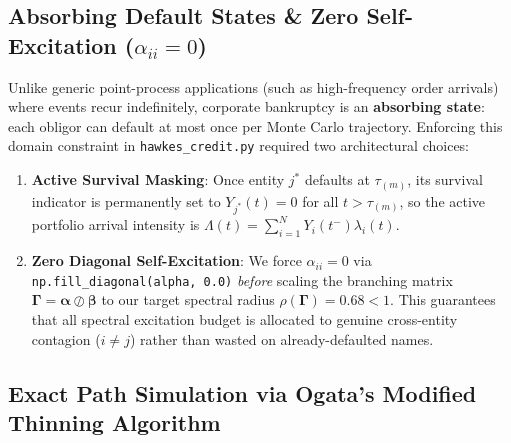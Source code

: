 \documentclass[11pt,a4paper]{article}
\begin{document}
\subsection{Absorbing Default States \& Zero Self-Excitation ($\alpha_{ii} = 0$)}

Unlike generic point-process applications (such as high-frequency order arrivals) where events recur indefinitely, corporate bankruptcy is an \textbf{absorbing state}: each obligor can default at most once per Monte Carlo trajectory. Enforcing this domain constraint in \texttt{hawkes\_credit.py} required two architectural choices:
\begin{enumerate}
  \item \textbf{Active Survival Masking}: Once entity $j^*$ defaults at $\tau_{(m)}$, its survival indicator is permanently set to $Y_{j^*}(t) = 0$ for all $t > \tau_{(m)}$, so the active portfolio arrival intensity is $\Lambda(t) = \sum_{i=1}^{N} Y_i(t^-) \lambda_i(t)$.
  \item \textbf{Zero Diagonal Self-Excitation}: We force $\alpha_{ii} = 0$ via \texttt{np.fill\_diagonal(alpha, 0.0)} \emph{before} scaling the branching matrix $\boldsymbol{\Gamma} = \boldsymbol{\alpha} \oslash \boldsymbol{\beta}$ to our target spectral radius $\rho(\boldsymbol{\Gamma}) = 0.68 < 1$. This guarantees that all spectral excitation budget is allocated to genuine cross-entity contagion ($i \neq j$) rather than wasted on already-defaulted names.
\end{enumerate}

\subsection{Exact Path Simulation via Ogata's Modified Thinning Algorithm}
\end{document}
